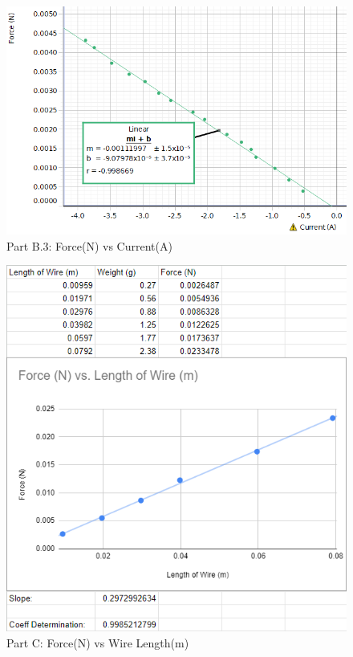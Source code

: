 \documentclass[../Lab.tex]{subfiles}
\begin{document}
\begin{figure}[H] %
	\centering %
	\includegraphics[width=1\textwidth]{Figures/Lab 9 set5.PNG} %
	\caption{Part B.3: Force(N) vs Current(A)}
\end{figure}
\begin{figure}[H] %
	\centering %
	\includegraphics[width=1\textwidth]{Figures/Part C Linear Fit.png} %
	\caption{Part C: Force(N) vs Wire Length(m)}
\end{figure}
\end{document}
